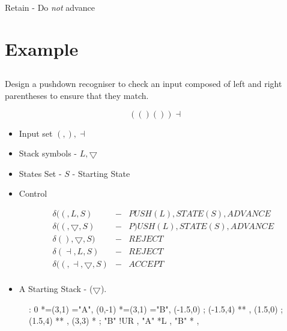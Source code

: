 \documentclass[a4paper,12pt]{article}
\begin{document}
Retain - Do \emph{not} advance

\section{Example}

\subsection{}

Design a pushdown recogniser to check an input composed of left and
right parentheses to ensure that they match.

\[ ( (  ) (  ) ) \dashv \]

\begin{itemize}

\item Input set ${(, ), \dashv }$

\item Stack symbols - ${L, \bigtriangledown}$

\item States Set - ${S}$ - Starting State

\item Control

\begin{eqnarray*}
\delta( (, L, S) & - & PUSH(L), STATE(S), ADVANCE \\
\delta( (, \bigtriangledown, S) & - & P)USH(L), STATE(S), ADVANCE \\
\delta( ), \bigtriangledown, S) & - & REJECT \\
\delta( \dashv, L, S) & - & REJECT \\
\delta( (, \dashv, \bigtriangledown, S) & - & ACCEPT \\
\end{eqnarray*}

\item A Starting Stack - ($\bigtriangledown$).

\end{itemize}

\begin{figure}[ht]
\xy <1cm,0cm>:
0 *=(3,1)\frm{-} ="A",
(0,-1) *=(3,1)\frm{-} ="B",
\POS (-1.5,0) ; (-1.5,4) **\dir{-} ,
\POS (1.5,0) ; (1.5,4) **\dir{-} ,
\POS (3,3) *\txt{$( ( ) ( ) ) \dashv$} \ar@{<->} ; "B" !UR ,
\POS "A" *{L} ,
\POS "B" *{\triangledown} ,
\endxy
\end{figure}

\subsection{}
\end{document}
